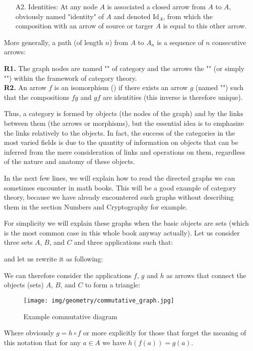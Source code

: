 {\begin{enumerate}
		\item[A2.] Identities: At any node $A$ is associated a closed arrow from $A$ to $A$, obviously named "identity" of $A$ and denoted $\text{Id}_A$, from which the composition with an arrow of source or targer $A$ is equal to this other arrow.
	\end{enumerate}
	More generally, a path (of length $n$) from $A$ to $A_n$ is a sequence of $n$ consecutive arrows:
	
	\begin{tcolorbox}[title=Remarks,colframe=black,arc=10pt]
	\textbf{R1.} The graph nodes are named "" of category and the arrows the "" (or simply "") within the framework of category theory.\\
	
	\textbf{R2.} An arrow $f$ is an isomorphism () if there exists an arrow $g$ (named "") such that the compositions $fg$ and $gf$ are identities (this inverse is therefore unique).
	\end{tcolorbox}	
	Thus, a category is formed by objects (the nodes of the graph) and by the links between them (the arrows or morphisms), but the essential idea is to emphasize the links relatively to the objects. In fact, the success of the categories in the most varied fields is due to the quantity of information on objects that can be inferred from the mere consideration of links and operations on them, regardless of the nature and anatomy of these objects.
	
	In the next few lines, we will explain how to read the directed graphs we can sometimes encounter in math books. This will be a good example of category theory, because we have already encountered such graphs without describing them in the section Numbers and Cryptography for example.
	
	For simplicity we will explain these graphs when the basic objects are  sets (which is the most common case in this whole book anyway actually).
	Let us consider three sets $A$, $B$, and $C$ and three applications such that:
	
	and let us rewrite it as following:
	
	We can therefore consider the applications $f$, $g$ and $h$ as arrows that connect the objects (sets) $A$, $B$, and $C$ to form a triangle:
	\begin{figure}[H]
		\centering
		\texttt{[image: img/geometry/commutative\_graph.jpg]}
		\caption{Example commutative diagram}
	\end{figure}
	Where obviously $g=h\circ f$ or more explicitly for those that forget the meaning of this notation that for any $a\in A$ we have $h(f(a))=g(a)$.
	
}
